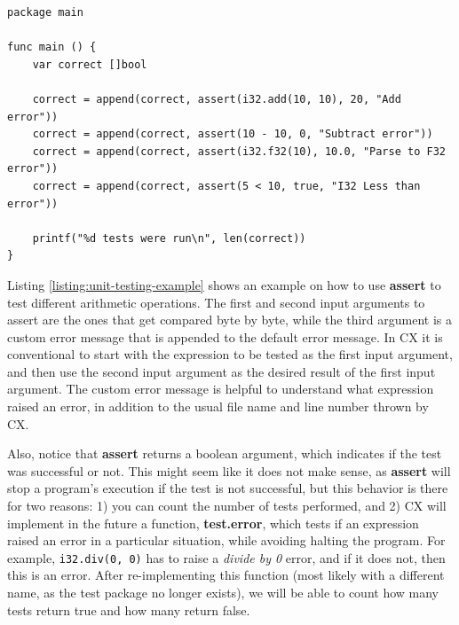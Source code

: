 \documentclass[11pt,fleqn,openany]{book} %
\begin{document}
\begin{lstlisting}[caption={Testing using assert},captionpos=b,label={listing:unit-testing-example}]
package main

func main () {
	var correct []bool

	correct = append(correct, assert(i32.add(10, 10), 20, "Add error"))
	correct = append(correct, assert(10 - 10, 0, "Subtract error"))
	correct = append(correct, assert(i32.f32(10), 10.0, "Parse to F32 error"))
	correct = append(correct, assert(5 < 10, true, "I32 Less than error"))

	printf("%d tests were run\n", len(correct))
}
\end{lstlisting}

Listing \ref{listing:unit-testing-example} shows an example on how to use \textbf{assert} to test different arithmetic operations. The first and second input arguments to assert are the ones that get compared byte by byte, while the third argument is a custom error message that is appended to the default error message. In CX it is conventional to start with the expression to be tested as the first input argument, and then use the second input argument as the desired result of the first input argument. The custom error message is helpful to understand what expression raised an error, in addition to the usual file name and line number thrown by CX.

Also, notice that \textbf{assert} returns a boolean argument, which indicates if the test was successful or not. This might seem like it does not make sense, as \textbf{assert} will stop a program's execution if the test is not successful, but this behavior is there for two reasons: 1) you can count the number of tests performed, and 2) CX will implement in the future a function, \textbf{test.error}, which tests if an expression raised an error in a particular situation, while avoiding halting the program. For example, \lstinline{i32.div(0, 0)} has to raise a \emph{divide by 0} error, and if it does not, then this is an error. After re-implementing this function (most likely with a different name, as the test package no longer exists), we will be able to count how many tests return true and how many return false.
\end{document}
